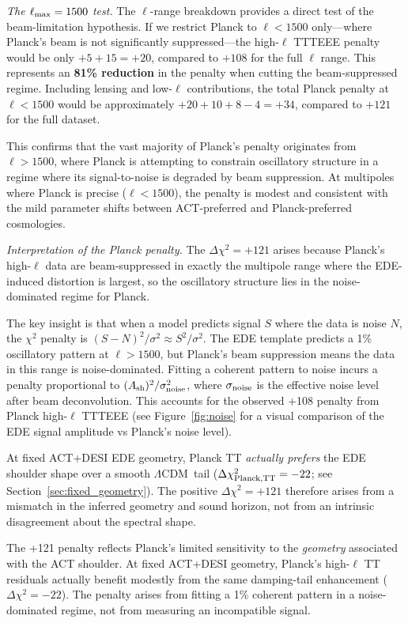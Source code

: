 \documentclass[twocolumn,showpacs,preprintnumbers,amsmath,amssymb,prd]{revtex4-2}
\newcommand{\lcdm}{$\Lambda$CDM}
\begin{document}
\emph{The $\ell_{\rm max} = 1500$ test.} The $\ell$-range breakdown provides 
a direct test of the beam-limitation hypothesis. If we restrict Planck to 
$\ell < 1500$ only---where Planck's beam is not significantly suppressed---the 
high-$\ell$ TTTEEE penalty would be only $+5 + 15 = +20$, compared to $+108$ 
for the full $\ell$ range. This represents an \textbf{81\% reduction} in the 
penalty when cutting the beam-suppressed regime. Including lensing and low-$\ell$ 
contributions, the total Planck penalty at $\ell < 1500$ would be approximately 
$+20 + 10 + 8 - 4 = +34$, compared to $+121$ for the full dataset.

This confirms that the vast majority of Planck's penalty originates from 
$\ell > 1500$, where Planck is attempting to constrain oscillatory structure 
in a regime where its signal-to-noise is degraded by beam suppression. At 
multipoles where Planck is precise ($\ell < 1500$), the penalty is modest and 
consistent with the mild parameter shifts between ACT-preferred and 
Planck-preferred cosmologies.

\emph{Interpretation of the Planck penalty.} The $\Delta\chi^2 = +121$ 
arises because Planck's high-$\ell$ data are beam-suppressed in exactly the 
multipole range where the EDE-induced distortion is largest, so the oscillatory 
structure lies in the noise-dominated regime for Planck.

The key insight is that when a model predicts signal $S$ where the data 
is noise $N$, the $\chi^2$ penalty is $(S-N)^2/\sigma^2 \approx S^2/\sigma^2$. 
The EDE template predicts a 1\% oscillatory pattern at $\ell > 1500$, but 
Planck's beam suppression means the data in this range is noise-dominated. 
Fitting a coherent pattern to noise incurs a penalty proportional to 
$(A_{\rm sh})^2/\sigma_{\rm noise}^2$, where $\sigma_{\rm noise}$ is the 
effective noise level after beam deconvolution. This accounts for the 
observed +108 penalty from Planck high-$\ell$ TTTEEE (see 
Figure~\ref{fig:noise} for a visual comparison of the EDE signal amplitude 
vs Planck's noise level).

At fixed ACT+DESI EDE geometry, Planck TT \emph{actually prefers} the 
EDE shoulder shape over a smooth \lcdm\ tail ($\Delta\chi^2_{\rm Planck,TT} = -22$; 
see Section~\ref{sec:fixed_geometry}). The positive $\Delta\chi^2 = +121$ 
therefore arises from a mismatch in the inferred geometry and sound horizon, 
not from an intrinsic disagreement about the spectral shape.

The +121 penalty reflects Planck's limited sensitivity to the \emph{geometry} 
associated with the ACT shoulder. At fixed ACT+DESI geometry, Planck's high-$\ell$ 
TT residuals actually benefit modestly from the same damping-tail enhancement 
($\Delta\chi^2 = -22$). The penalty arises from fitting a 1\% coherent pattern 
in a noise-dominated regime, not from measuring an incompatible signal.
\end{document}

